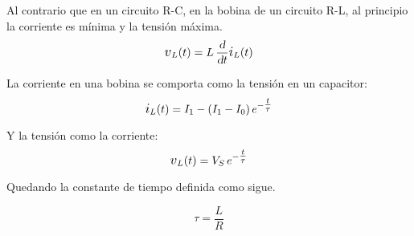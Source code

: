 Al contrario que en un circuito R-C, en la bobina de un circuito R-L, al principio la corriente es mínima y la tensión máxima.
\begin{equation*}
    \voltage_L(t) = L \, \frac{\dif}{\dif t} \current_L(t)
\end{equation*}

La corriente en una bobina se comporta como la tensión en un capacitor:
\begin{equation*}
    \current_L(t) = I_1 - \inParentheses{I_1 - I_0} e^{-\tfrac{t}{\tau}}
\end{equation*}

Y la tensión como la corriente:
\begin{equation*}
    \voltage_L(t) = V_S \, e^{-\tfrac{t}{\tau}}
\end{equation*}

Quedando la constante de tiempo definida como sigue.

\begin{mdframed}[style=MyFrame1]
    \begin{defn}
    \end{defn}
    \begin{equation*}
        \tau = \frac{L}{R}
    \end{equation*}
\end{mdframed}